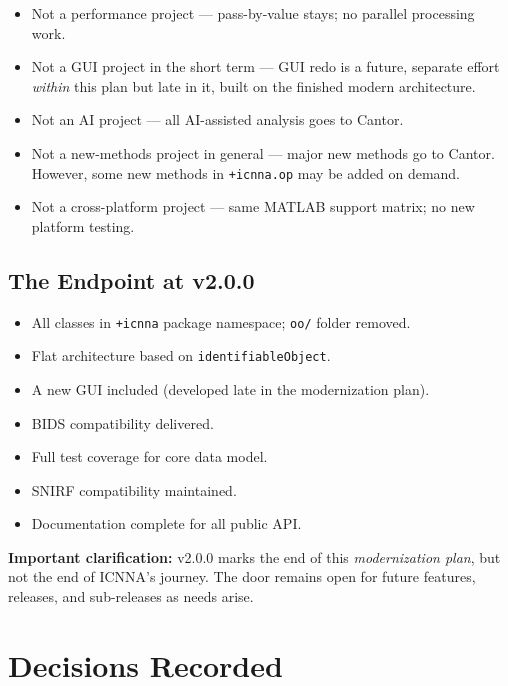 \documentclass[11pt,a4paper]{article}
\begin{document}
\begin{itemize}
    \item Not a performance project --- pass-by-value stays; no parallel processing work.
    \item Not a GUI project in the short term --- GUI redo is a future, separate effort \emph{within} this plan but late in it, built on the finished modern architecture.
    \item Not an AI project --- all AI-assisted analysis goes to Cantor.
    \item Not a new-methods project in general --- major new methods go to Cantor. However, some new methods in \texttt{+icnna.op} may be added on demand.
    \item Not a cross-platform project --- same MATLAB support matrix; no new platform testing.
\end{itemize}

\subsection{The Endpoint at v2.0.0}

\begin{itemize}
    \item All classes in \texttt{+icnna} package namespace; \texttt{oo/} folder removed.
    \item Flat architecture based on \texttt{identifiableObject}.
    \item A new GUI included (developed late in the modernization plan).
    \item BIDS compatibility delivered.
    \item Full test coverage for core data model.
    \item SNIRF compatibility maintained.
    \item Documentation complete for all public API.
\end{itemize}

\textbf{Important clarification:} v2.0.0 marks the end of this \emph{modernization plan}, but not the end of ICNNA's journey. The door remains open for future features, releases, and sub-releases as needs arise.

\section{Decisions Recorded}
\end{document}
